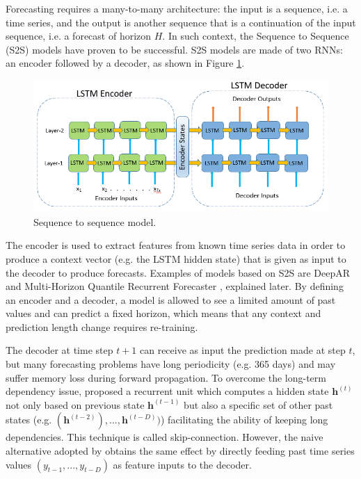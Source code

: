 \documentclass[a4paper, 12pt]{article} %
\begin{document}
	Forecasting requires a many-to-many architecture: the input is a sequence, i.e. a time series, and the output is another sequence that is a continuation of the input sequence, i.e. a forecast of horizon $H$. In such context, the Sequence to Sequence (S2S) \cite{seq2seq} models have proven to be successful. S2S models are made of two RNNs: an encoder followed by a decoder, as shown in Figure \ref{fig:seq2seq}.
	\begin{figure}
		\includegraphics[width=\linewidth]{img/seq2seq.png}
		\caption{Sequence to sequence model.}
		\label{fig:seq2seq}
	\end{figure}
	 The encoder is used to extract features from known time series data in order to produce a context vector (e.g. the LSTM hidden state) that is given as input to the decoder to produce forecasts. Examples of models based on S2S are DeepAR \cite{DeepAR} and Multi-Horizon Quantile Recurrent Forecaster \cite{MQCNN}, explained later. By defining an encoder and a decoder, a model is allowed to see a limited amount of past values and can predict a fixed horizon, which means that any context and prediction length change requires re-training. 
	 
	 The decoder at time step $t+1$ can receive as input the prediction made at step $t$, but many forecasting problems have long periodicity (e.g. 365 days) and may suffer memory loss during forward propagation. To overcome the long-term dependency issue, \cite{NARX} proposed a recurrent unit which computes a hidden state $\pmb{h}^{(t)}$ not only based on previous state $\pmb{h}^{(t-1)}$ but also a specific set of other past states (e.g. $(\pmb{h}^{(t-2)}), ..., \pmb{h}^{(t-D)})$) facilitating the ability of keeping long dependencies. This technique is called skip-connection. However, the naive alternative adopted by \cite{DeepAR, MQCNN} obtains the same effect by directly feeding past time series values $(y_{t-1}, ..., y_{t-D})$ as feature inputs to the decoder.
	
\end{document}
